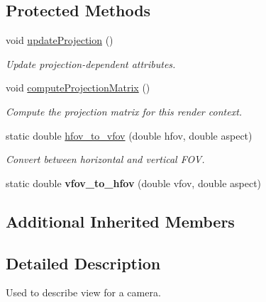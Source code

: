 \subsection*{Protected Methods}
\begin{DoxyCompactItemize}
\item 
\mbox{\label{classrev_1_1_render_projection_a338998f911ea62ee1e8232e5cf59eba8}} 
void \mbox{\hyperlink{classrev_1_1_render_projection_a338998f911ea62ee1e8232e5cf59eba8}{update\+Projection}} ()
\begin{DoxyCompactList}\small\item\em Update projection-\/dependent attributes. \end{DoxyCompactList}\item 
void \mbox{\hyperlink{classrev_1_1_render_projection_a809aadf6b38d1568019704f7969ad41b}{compute\+Projection\+Matrix}} ()
\begin{DoxyCompactList}\small\item\em Compute the projection matrix for this render context. \end{DoxyCompactList}\item 
\mbox{\label{classrev_1_1_render_projection_a9da510db47cc9bc98d4782df4ba02eb7}} 
static double \mbox{\hyperlink{classrev_1_1_render_projection_a9da510db47cc9bc98d4782df4ba02eb7}{hfov\+\_\+to\+\_\+vfov}} (double hfov, double aspect)
\begin{DoxyCompactList}\small\item\em Convert between horizontal and vertical F\+OV. \end{DoxyCompactList}\item 
\mbox{\label{classrev_1_1_render_projection_a7bbdbe3ab33a710353a311718150107e}} 
static double {\bfseries vfov\+\_\+to\+\_\+hfov} (double vfov, double aspect)
\end{DoxyCompactItemize}
\subsection*{Additional Inherited Members}


\subsection{Detailed Description}
Used to describe view for a camera. 

